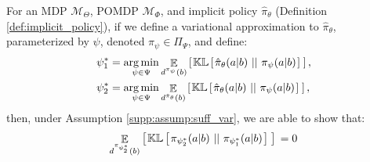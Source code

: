 \begin{lemma}\label{supp:lemma:3}
    For an MDP $\mathcal{M}_{\Theta}$, POMDP $\mathcal{M}_{\Phi}$, and implicit policy $\hat{\pi}_{\theta}$ (Definition \ref{def:implicit_policy}), if we define a variational approximation to $\hat{\pi}_{\theta}$, parameterized by $\psi$, denoted $\pi_{\psi} \in \Pi_{\Psi}$, and define: 
    \begin{align}
       \psi^*_1 &= \mathop{\operatorname{arg\,min}}_{\psi \in \Psi}  \mathop{\mathbb{E}}_{d^{\pi_{\psi}}(b)}  \left[ \hspace*{0.1em}{}  \mathbb{KL} \left[ \hspace*{0.1em}{}  \hat{\pi}_{\theta}(a|b) \ ||\ {} \pi_\psi(a|b) \hspace*{0.1em} \right]{}  \hspace*{0.1em} \right]{} ,  \label{supp:equ:make_it_stop_before}\\
       \psi^*_2 &= \mathop{\operatorname{arg\,min}}_{\psi \in \Psi}  \mathop{\mathbb{E}}_{d^{\hat{\pi}_{\theta}}(b)}  \left[ \hspace*{0.1em}{}  \mathbb{KL} \left[ \hspace*{0.1em}{}  \hat{\pi}_{\theta}(a|b)\ ||\ {} \pi_\psi(a|b) \hspace*{0.1em} \right]{}  \hspace*{0.1em} \right]{} , \label{supp:equ:make_it_stop}
    \end{align}
    then, under Assumption \ref{supp:assump:suff_var}, we are able to show that:
    \begin{align}
        \mathop{\mathbb{E}}_{d^{\pi_{\psi^*_2}}(b)}  \left[ \hspace*{0.1em}{}  \mathbb{KL} \left[ \hspace*{0.1em}{}  \pi_{\psi^*_2}(a|b) \ ||\ {} \pi_{\psi^*_1}(a|b) \hspace*{0.1em} \right]{}  \hspace*{0.1em} \right]{} = 0
    \end{align}
\end{lemma}
